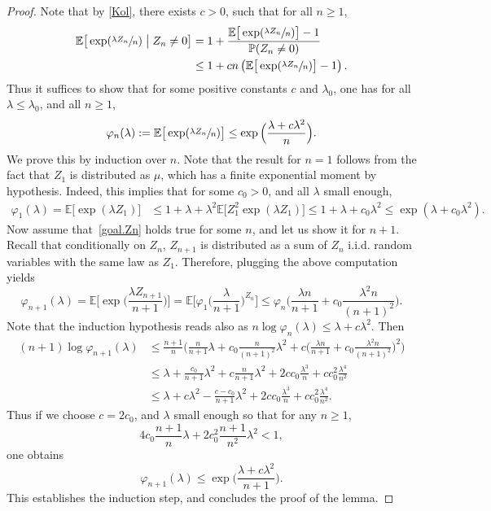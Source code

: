 \begin{proof}
Note that by \eqref{Kol}, there exists $c>0$, such that for all $n\ge 1$,
\begin{align*}
\mathbb E\big[\exp(\sfrac{\lambda Z_n}{n})\bigm| Z_n\neq 0\big] & = 1+ \frac{\mathbb E\big[\exp(\sfrac{\lambda Z_n}{n})\big] - 1}{\mathbb P(Z_n\neq 0)}\\
& \le 1+ cn \left(\mathbb E\big[\exp(\sfrac{\lambda Z_n}{n})\big] - 1\right).
\end{align*}
Thus it suffices to show that for some positive constants $c$ and $\lambda_0$, one has for all $\lambda\le \lambda_0$, and all $n\ge 1$,
\begin{equation}\label{goal.Zn}
\varphi_n(\lambda):=\mathbb E\big[\exp(\sfrac{\lambda Z_n}{n})\big] \le \exp\Big(\frac{\lambda+c\lambda^2}{n}\Big).
\end{equation}
We prove this by induction over $n$. Note that the result for $n=1$ follows from the fact that $Z_1$ is distributed as $\mu$, which
has a finite exponential moment by hypothesis.
Indeed, this implies that for some $c_0>0$, and all $\lambda$ small enough,
\begin{align*}
\varphi_1(\lambda) = \mathbb E\big[\exp(\lambda Z_1)\big] & \le 1 + \lambda+ \lambda^2 \mathbb E\big[Z_1^2\exp(\lambda Z_1)\big] \le 1+ \lambda+
c_0 \lambda^2 \le \exp(\lambda+c_0 \lambda^2).
\end{align*}
Now assume that~\eqref{goal.Zn} holds true for some $n$, and let us show it for $n+1$.
Recall that conditionally on $Z_n$, $Z_{n+1}$ is distributed
as a sum of $Z_n$ i.i.d. random variables with the same law as $Z_1$.
Therefore, plugging the above computation yields
\[
\varphi_{n+1}(\lambda)= \mathbb E\Big[\exp\Big(\frac{\lambda Z_{n+1}}{n+1}\Big)\Big] = \mathbb E\Big[ \varphi_1\Big(\frac{\lambda}{n+1}\Big)^{Z_n}\Big]\le \varphi_n\Big(\frac{\lambda n}{n+1} + c_0\frac{\lambda^2 n}{(n+1)^2}\Big).
\]
Note that the induction hypothesis reads also as
$n\log \varphi_n(\lambda)\le \lambda+ c\lambda^2$. Then
\begin{equation*}%
\begin{split}
(n+1)\log \varphi_{n+1}(\lambda) & \le
\frac{n+1}{n}\Big(\frac{n}{n+1}\lambda+c_0\frac{n}{(n+1)^2}\lambda^2 +
c\Big(\frac{\lambda n}{n+1} + c_0\frac{\lambda^2 n}{(n+1)^2}\Big)^2\Big)\\
& \le \lambda +\frac{c_0}{n+1}\lambda^2+c\frac{n}{n+1}\lambda^2
+ 2cc_0\frac{\lambda^3}{n}+cc_0^2\frac{\lambda^4}{n^2}\\
& \le \lambda+ c\lambda^2-\frac{c-c_0}{n+1}\lambda^2+
2cc_0\frac{\lambda^3}{n}+cc_0^2\frac{\lambda^4}{n^2}.
\end{split}
\end{equation*}
Thus if we choose $c=2c_0$, and $\lambda$ small enough so that
for any $n\ge 1$,
\[
4c_0 \frac{n+1}{n} \lambda+ 2c_0^2\frac{n+1}{n^2} \lambda^2<1,
\]
one obtains
\begin{equation*}
\varphi_{n+1}(\lambda)\le \exp\Big(\frac{\lambda +c\lambda^2}{n+1}\Big).
\end{equation*}
This establishes the induction step, and concludes the proof of the lemma.
\end{proof}
